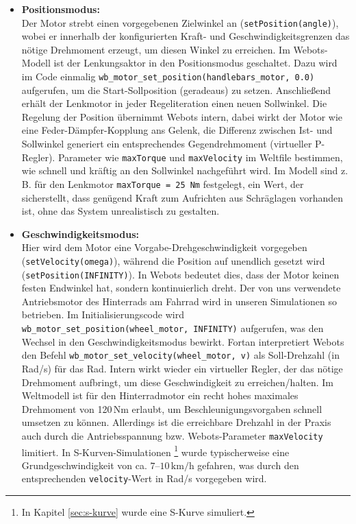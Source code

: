   \begin{itemize}
    \item \textbf{Positionsmodus:} \\
    Der Motor strebt einen vorgegebenen Zielwinkel an (\texttt{setPosition(angle)}), 
    wobei er innerhalb der konfigurierten Kraft- und Geschwindigkeitsgrenzen das nötige Drehmoment erzeugt, 
    um diesen Winkel zu erreichen. Im Webots-Modell ist der Lenkungsaktor in den Positionsmodus geschaltet.  
    Dazu wird im Code einmalig \texttt{wb\_motor\_set\_position(handlebars\_motor, 0.0)} 
    aufgerufen, um die Start-Sollposition (geradeaus) zu setzen.  
    Anschließend erhält der Lenkmotor in jeder Regeliteration einen neuen Sollwinkel.  
    Die Regelung der Position übernimmt Webots intern, dabei wirkt der Motor wie eine Feder-Dämpfer-Kopplung ans Gelenk, 
    die Differenz zwischen Ist- und Sollwinkel generiert ein entsprechendes Gegendrehmoment (virtueller P-Regler).  
    Parameter wie \texttt{maxTorque} und \texttt{maxVelocity} im Weltfile bestimmen, 
    wie schnell und kräftig an den Sollwinkel nachgeführt wird.  
    Im Modell sind z.\,B. für den Lenkmotor \texttt{maxTorque = 25\,Nm} festgelegt, 
    ein Wert, der sicherstellt, dass genügend Kraft zum Aufrichten aus Schräglagen vorhanden ist, 
    ohne das System unrealistisch zu gestalten.

    \item \textbf{Geschwindigkeitsmodus:} \\
    Hier wird dem Motor eine Vorgabe-Drehgeschwindigkeit vorgegeben (\texttt{setVelocity(omega)}), 
    während die Position auf unendlich gesetzt wird (\texttt{setPosition(INFINITY)}).  
    In Webots bedeutet dies, dass der Motor keinen festen Endwinkel hat, sondern kontinuierlich dreht.  
    Der von uns verwendete Antriebsmotor des Hinterrads am Fahrrad wird in unseren Simulationen so betrieben.
    Im Initialisierungscode wird \texttt{wb\_motor\_set\_position(wheel\_motor, INFINITY)} 
    aufgerufen, was den Wechsel in den Geschwindigkeitsmodus bewirkt.  
    Fortan interpretiert Webots den Befehl \texttt{wb\_motor\_set\_velocity(wheel\_motor, v)} 
    als Soll-Drehzahl (in Rad/s) für das Rad.  
    Intern wirkt wieder ein virtueller Regler, der das nötige Drehmoment aufbringt, 
    um diese Geschwindigkeit zu erreichen/halten.  
    Im Weltmodell ist für den Hinterradmotor ein recht hohes maximales Drehmoment von 120\,Nm erlaubt, 
    um Beschleunigungsvorgaben schnell umsetzen zu können.  
    Allerdings ist die erreichbare Drehzahl in der Praxis auch durch die Antriebsspannung bzw. Webots-Parameter 
    \texttt{maxVelocity} limitiert.  
    In S-Kurven-Simulationen \footnote{In Kapitel \ref{sec:s-kurve} wurde eine S-Kurve simuliert.} wurde typischerweise 
    eine Grundgeschwindigkeit von ca. $7$–$10\,\mathrm{km/h}$ gefahren, 
    was durch den entsprechenden \texttt{velocity}-Wert in Rad/s vorgegeben wird.
    

\end{itemize}
